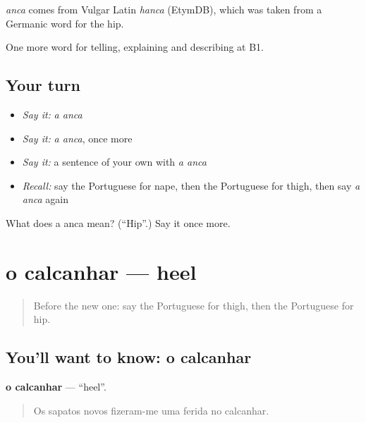 \begin{cousinweb}
\emph{anca} comes from Vulgar Latin \emph{hanca} (EtymDB), which was taken from a Germanic word for the hip.
\end{cousinweb}

\begin{grammarlens}[title={What you've built}]
One more word for telling, explaining and describing at B1.
\end{grammarlens}

\subsection*{Your turn}
\begin{itemize}
\raggedright
  \item \emph{Say it:} \emph{a anca}
  \item \emph{Say it:} \emph{a anca}, once more
  \item \emph{Say it:} a sentence of your own with \emph{a anca}
  \item \emph{Recall:} say the Portuguese for nape, then the Portuguese for thigh, then say \emph{a anca} again
\end{itemize}

\begin{tcolorbox}[breakable,colback=teal!4,colframe=teal!35!black,title={Before you move on}]
What does a anca mean? (\textquotedblleft{}Hip\textquotedblright{}.) Say it once more.
\end{tcolorbox}
\section[o calcanhar]{o calcanhar — heel}

\label{lesson:PT-C482-calcanhar}



\begin{quote}
Before the new one: say the Portuguese for thigh, then the Portuguese for hip.
\end{quote}

\subsection*{You'll want to know: o calcanhar}
\textbf{o calcanhar} — \textquotedblleft{}heel\textquotedblright{}.

\begin{quote}
Os sapatos novos fizeram-me uma ferida no calcanhar.
\end{quote}

